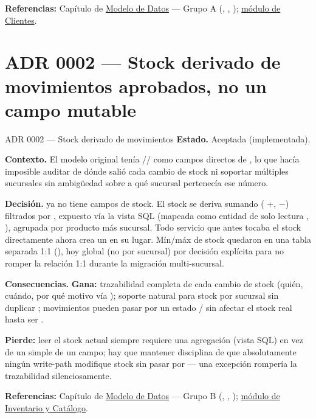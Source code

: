 \textbf{Referencias:} Capítulo de \hyperref[sec:modelo-datos]{Modelo de Datos} --- Grupo A (, , ); \hyperref[mod:06-clientes]{módulo de Clientes}.

\section{ADR 0002 --- Stock derivado de movimientos aprobados, no un campo mutable}
\label{adr:0002}

\begin{cajaADR}{ADR 0002 --- Stock derivado de movimientos}
\textbf{Estado.} Aceptada (implementada).

\textbf{Contexto.} El modelo original tenía // como campos directos de , lo que hacía imposible auditar de dónde salió cada cambio de stock ni soportar múltiples sucursales sin ambigüedad sobre a qué sucursal pertenecía ese número.

\textbf{Decisión.}  ya no tiene campos de stock. El stock se deriva sumando  ( +,  $-$) filtrados por , expuesto vía la vista SQL  (mapeada como entidad de solo lectura , ), agrupada por producto más sucursal. Todo servicio que antes tocaba el stock directamente ahora crea un  en su lugar. Mín/máx de stock quedaron en una tabla separada 1:1 (\allowbreak {}\allowbreak {}), hoy global (no por sucursal) por decisión explícita para no romper la relación 1:1 durante la migración multi-sucursal.

\textbf{Consecuencias.} \textbf{Gana:} trazabilidad completa de cada cambio de stock (quién, cuándo, por qué motivo vía ); soporte natural para stock por sucursal sin duplicar ; movimientos pueden pasar por un estado / sin afectar el stock real hasta ser .

\textbf{Pierde:} leer el stock actual siempre requiere una agregación (vista SQL) en vez de un simple  de un campo; hay que mantener disciplina de que absolutamente ningún write-path modifique stock sin pasar por  --- una excepción rompería la trazabilidad silenciosamente.
\end{cajaADR}

\textbf{Referencias:} Capítulo de \hyperref[sec:modelo-datos]{Modelo de Datos} --- Grupo B (, , \allowbreak {}\allowbreak {}); \hyperref[mod:07-inventario-catalogo]{módulo de Inventario y Catálogo}.

